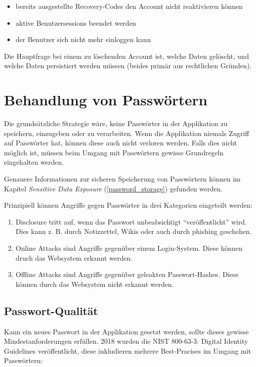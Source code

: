 \begin{itemize}
	\item bereits ausgestellte Recovery-Codes den Account nicht reaktivieren können
	\item aktive Benutzersessions beendet werden
	\item der Benutzer sich nicht mehr einloggen kann
\end{itemize}

Die Hauptfrage bei einem zu löschenden Account ist, welche Daten gelöscht, und welche Daten persistiert werden müssen (beides primär aus rechtlichen Gründen).

\section{Behandlung von Passwörtern}

Die grundsätzliche Strategie wäre, keine Passwörter in der Applikation zu speichern, einzugeben oder zu verarbeiten. Wenn die Applikation niemals Zugriff auf Passwörter hat, können diese auch nicht verloren werden. Falls dies nicht möglich ist, müssen beim Umgang mit Passwörtern gewisse Grundregeln eingehalten werden.

Genauere Informationen zur sicheren Speicherung von Passwörtern können im Kapitel \textit{Sensitive Data Exposure} (\ref{password_storage}) gefunden werden.

Prinzipiell können Angriffe gegen Passwörter in drei Kategorien eingeteilt werden:

\begin{enumerate}
	\item Disclosure tritt auf, wenn das Passwort unbeabsichtigt ``veröffentlicht'' wird. Dies kann z. B. durch Notizzettel, Wikis oder auch durch phishing geschehen.
	\item Online Attacks sind Angriffe gegenüber einem Login-System. Diese können druch das Websystem erkannt werden.
	\item Offline Attacks sind Angriffe gegenüber geleakten Passwort-Hashes. Diese können durch das Websystem nicht erkannt werden.
\end{enumerate}

\subsection{Passwort-Qualität}

Kann ein neues Passwort in der Applikation gesetzt werden, sollte dieses gewisse Mindestanforderungen erfüllen. 2018 wurden die NIST 800-63-3: Digital Identity Guidelines veröffentlicht, diese inkludieren mehrere Best-Pracises im Umgang mit Passwörtern:

